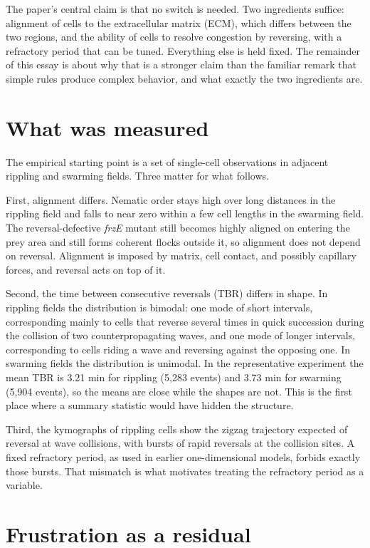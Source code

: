 \documentclass[11pt]{article}
\theoremstyle{definition}
\theoremstyle{remark}
\begin{document}
The paper's central claim is that no switch is needed. Two ingredients suffice: alignment of cells to the extracellular matrix (ECM), which differs between the two regions, and the ability of cells to resolve congestion by reversing, with a refractory period that can be tuned. Everything else is held fixed. The remainder of this essay is about why that is a stronger claim than the familiar remark that simple rules produce complex behavior, and what exactly the two ingredients are.

\section{What was measured}

The empirical starting point is a set of single-cell observations in adjacent rippling and swarming fields. Three matter for what follows.

First, alignment differs. Nematic order stays high over long distances in the rippling field and falls to near zero within a few cell lengths in the swarming field. The reversal-defective \emph{frzE} mutant still becomes highly aligned on entering the prey area and still forms coherent flocks outside it, so alignment does not depend on reversal. Alignment is imposed by matrix, cell contact, and possibly capillary forces, and reversal acts on top of it.

Second, the time between consecutive reversals (TBR) differs in shape. In rippling fields the distribution is bimodal: one mode of short intervals, corresponding mainly to cells that reverse several times in quick succession during the collision of two counterpropagating waves, and one mode of longer intervals, corresponding to cells riding a wave and reversing against the opposing one. In swarming fields the distribution is unimodal. In the representative experiment the mean TBR is 3.21 min for rippling (5,283 events) and 3.73 min for swarming (5,904 events), so the means are close while the shapes are not. This is the first place where a summary statistic would have hidden the structure.

Third, the kymographs of rippling cells show the zigzag trajectory expected of reversal at wave collisions, with bursts of rapid reversals at the collision sites. A fixed refractory period, as used in earlier one-dimensional models, forbids exactly those bursts. That mismatch is what motivates treating the refractory period as a variable.

\section{Frustration as a residual}
\end{document}
